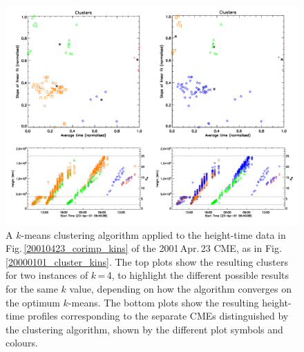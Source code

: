 \documentclass[referee,a4paper,12pt,traditabstract]{swsc}
\begin{document}
\begin{linenumbers}
\begin{figure}[ht]
\centerline{\includegraphics[width=\linewidth]{images/20010423_cluster_kins.pdf}}
\caption{A $k$-means clustering algorithm applied to the height-time data in Fig.\,\ref{20010423_corimp_kins} of the 2001\,Apr.\,23 CME, as in Fig.\,\ref{20000101_cluster_kins}. The top plots show the resulting clusters for two instances of $k$\,=\,4, to highlight the different possible results for the same $k$ value, depending on how the algorithm converges on the optimum $k$-means. The bottom plots show the resulting height-time profiles corresponding to the separate CMEs distinguished by the clustering algorithm, shown by the different plot symbols and colours.}
\label{20010423_cluster_kins}
\end{figure}



\end{linenumbers}
\end{document}
